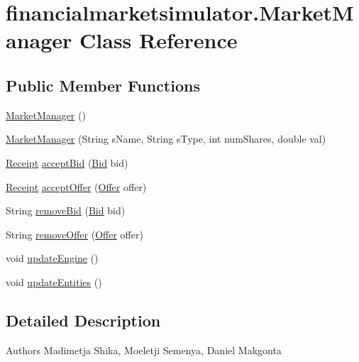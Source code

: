 \hypertarget{classfinancialmarketsimulator_1_1_market_manager}{\section{financialmarketsimulator.\+Market\+Manager Class Reference}
\label{classfinancialmarketsimulator_1_1_market_manager}
}
\subsection*{Public Member Functions}
\begin{DoxyCompactItemize}
\item 
\hyperlink{classfinancialmarketsimulator_1_1_market_manager_a59e7711f4974dd07fb5aa89f77824f86}{Market\+Manager} ()
\item 
\hyperlink{classfinancialmarketsimulator_1_1_market_manager_abec3bfc62ba95bd12c444492b7cad61e}{Market\+Manager} (String s\+Name, String s\+Type, int num\+Shares, double val)
\item 
\hyperlink{classfinancialmarketsimulator_1_1receipts_1_1_receipt}{Receipt} \hyperlink{classfinancialmarketsimulator_1_1_market_manager_a628b1d67f2d120933d52c0311f733a8e}{accept\+Bid} (\hyperlink{classfinancialmarketsimulator_1_1_bid}{Bid} bid)
\item 
\hyperlink{classfinancialmarketsimulator_1_1receipts_1_1_receipt}{Receipt} \hyperlink{classfinancialmarketsimulator_1_1_market_manager_a46a095623bcda32e2ff6f3d85b4f8994}{accept\+Offer} (\hyperlink{classfinancialmarketsimulator_1_1_offer}{Offer} offer)
\item 
String \hyperlink{classfinancialmarketsimulator_1_1_market_manager_aa8c0454b1d66599ff5abbb01d35790e8}{remove\+Bid} (\hyperlink{classfinancialmarketsimulator_1_1_bid}{Bid} bid)
\item 
String \hyperlink{classfinancialmarketsimulator_1_1_market_manager_ad49a43c96b962562014c7bb37dfa5f7e}{remove\+Offer} (\hyperlink{classfinancialmarketsimulator_1_1_offer}{Offer} offer)
\item 
void \hyperlink{classfinancialmarketsimulator_1_1_market_manager_afb2bf557ed70cd23feccddfb5c01ab0d}{update\+Engine} ()
\item 
void \hyperlink{classfinancialmarketsimulator_1_1_market_manager_a32d674b201543e3a6783ec64ba172266}{update\+Entities} ()
\end{DoxyCompactItemize}


\subsection{Detailed Description}
\begin{DoxyAuthor}{Authors}
Madimetja Shika, Moeletji Semenya, Daniel Makgonta 
\end{DoxyAuthor}


